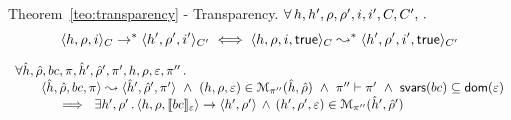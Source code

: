 \begin{temax}{Theorem~\ref{teo:transparency} - Transparency.} 
$\forall \, h, h', \rho, \rho', i, i', C, C', \, . \,$
$$
  \semtranstrans{\heap, \store, i}{\heap', \store', i'}[\ctx][\ctx']
  \iff
  \symbtranstrans{\heap, \store, i, \jtrue}{\heap', \store', i', \jtrue}[\ctx][\ctx'] 
$$
\end{temax}

\begin{lemma}\label{soundness:basic:commands}
$$
\begin{array}{l}
\forall \sheap, \sstore, \bcmd, \pc, \sheap', \sstore',  \pc', \heap, \store, \senv, \pc'' \, .\\
\qquad \symbtrans{\sheap, \sstore, \bcmd, \pc}{\sheap', \sstore', \pc'}
   \ \wedge \ 
      (\heap, \store, \senv) \in \smodels{\sheap, \sstore}{\pc''} 
            \ \wedge \ \pc'' \vdash \pc' \ \wedge \ \svarsreallyqueen(\bcmd) \subseteq \domain(\senv) \\ \qquad \quad
      	 \ \implies \ \exists \heap', \store' \, . \, 
	 	 \semtrans{\heap, \store, \symbeval{\bcmd}{\senv}}{\heap', \store'}
		\, \wedge \, 
		(\heap', \store', \senv) \in \smodels{\sheap', \sstore'}{\pc''}  
\end{array}
$$
\end{lemma}
